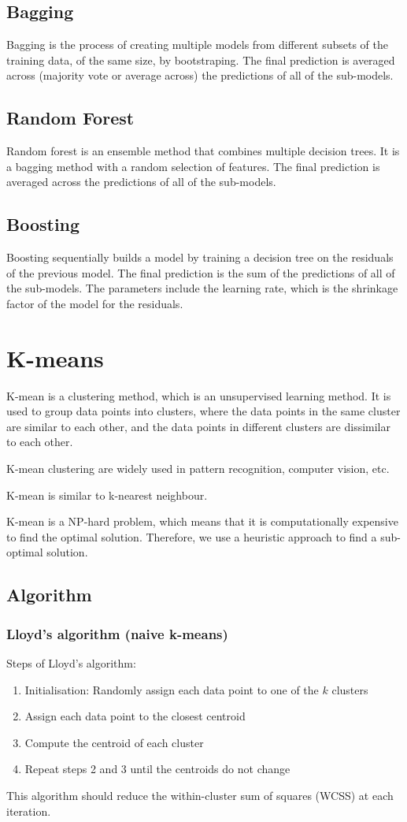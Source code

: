 \documentclass[12pt,a4paper]{article}
\begin{document}
\subsection{Bagging}
Bagging is the process of creating multiple models from different subsets of the training data, of the same size, by bootstraping. The final prediction is averaged across (majority vote or average across) the predictions of all of the sub-models.
\subsection{Random Forest}
Random forest is an ensemble method that combines multiple decision trees. It is a bagging method with a random selection of features. The final prediction is averaged across the predictions of all of the sub-models.
\subsection{Boosting}
Boosting sequentially builds a model by training a decision tree on the residuals of the previous model. The final prediction is the sum of the predictions of all of the sub-models. The parameters include the learning rate, which is the shrinkage factor of the model for the residuals.

\section{K-means}
K-mean is a clustering method, which is an unsupervised learning method. It is used to group data points into clusters, where the data points in the same cluster are similar to each other, and the data points in different clusters are dissimilar to each other.

K-mean clustering are widely used in pattern recognition, computer vision, etc.

K-mean is similar to k-nearest neighbour.

K-mean is a NP-hard problem, which means that it is computationally expensive to find the optimal solution. Therefore, we use a heuristic approach to find a sub-optimal solution.
\subsection{Algorithm}
\subsubsection{Lloyd’s algorithm (naive k-means)}
Steps of Lloyd’s algorithm:
\begin{enumerate}
    \item Initialisation: Randomly assign each data point to one of the $k$ clusters
    \item Assign each data point to the closest centroid
    \item Compute the centroid of each cluster
    \item Repeat steps 2 and 3 until the centroids do not change
\end{enumerate}
This algorithm should reduce the within-cluster sum of squares (WCSS) at each iteration.
\end{document}
